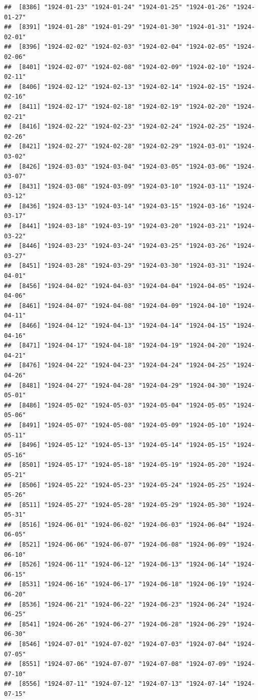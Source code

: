 \documentclass{article}\usepackage[]{graphicx}\usepackage[]{color}
\makeatletter
\newenvironment{kframe}{%
 \def\at@end@of@kframe{}%
 \ifinner\ifhmode%
  \def\at@end@of@kframe{\end{minipage}}%
  \begin{minipage}{\columnwidth}%
 \fi\fi%
 \def\FrameCommand##1{\hskip\@totalleftmargin \hskip-\fboxsep
 \colorbox{shadecolor}{##1}\hskip-\fboxsep
     \hskip-\linewidth \hskip-\@totalleftmargin \hskip\columnwidth}%
 \MakeFramed {\advance\hsize-\width
   \@totalleftmargin\z@ \linewidth\hsize
   \@setminipage}}%
 {\par\unskip\endMakeFramed%
 \at@end@of@kframe}
\newenvironment{knitrout}{}{} %
\makeatother
\begin{document}
\begin{description}
\begin{knitrout}
\begin{kframe}
\begin{verbatim}
##  [8386] "1924-01-23" "1924-01-24" "1924-01-25" "1924-01-26" "1924-01-27"
##  [8391] "1924-01-28" "1924-01-29" "1924-01-30" "1924-01-31" "1924-02-01"
##  [8396] "1924-02-02" "1924-02-03" "1924-02-04" "1924-02-05" "1924-02-06"
##  [8401] "1924-02-07" "1924-02-08" "1924-02-09" "1924-02-10" "1924-02-11"
##  [8406] "1924-02-12" "1924-02-13" "1924-02-14" "1924-02-15" "1924-02-16"
##  [8411] "1924-02-17" "1924-02-18" "1924-02-19" "1924-02-20" "1924-02-21"
##  [8416] "1924-02-22" "1924-02-23" "1924-02-24" "1924-02-25" "1924-02-26"
##  [8421] "1924-02-27" "1924-02-28" "1924-02-29" "1924-03-01" "1924-03-02"
##  [8426] "1924-03-03" "1924-03-04" "1924-03-05" "1924-03-06" "1924-03-07"
##  [8431] "1924-03-08" "1924-03-09" "1924-03-10" "1924-03-11" "1924-03-12"
##  [8436] "1924-03-13" "1924-03-14" "1924-03-15" "1924-03-16" "1924-03-17"
##  [8441] "1924-03-18" "1924-03-19" "1924-03-20" "1924-03-21" "1924-03-22"
##  [8446] "1924-03-23" "1924-03-24" "1924-03-25" "1924-03-26" "1924-03-27"
##  [8451] "1924-03-28" "1924-03-29" "1924-03-30" "1924-03-31" "1924-04-01"
##  [8456] "1924-04-02" "1924-04-03" "1924-04-04" "1924-04-05" "1924-04-06"
##  [8461] "1924-04-07" "1924-04-08" "1924-04-09" "1924-04-10" "1924-04-11"
##  [8466] "1924-04-12" "1924-04-13" "1924-04-14" "1924-04-15" "1924-04-16"
##  [8471] "1924-04-17" "1924-04-18" "1924-04-19" "1924-04-20" "1924-04-21"
##  [8476] "1924-04-22" "1924-04-23" "1924-04-24" "1924-04-25" "1924-04-26"
##  [8481] "1924-04-27" "1924-04-28" "1924-04-29" "1924-04-30" "1924-05-01"
##  [8486] "1924-05-02" "1924-05-03" "1924-05-04" "1924-05-05" "1924-05-06"
##  [8491] "1924-05-07" "1924-05-08" "1924-05-09" "1924-05-10" "1924-05-11"
##  [8496] "1924-05-12" "1924-05-13" "1924-05-14" "1924-05-15" "1924-05-16"
##  [8501] "1924-05-17" "1924-05-18" "1924-05-19" "1924-05-20" "1924-05-21"
##  [8506] "1924-05-22" "1924-05-23" "1924-05-24" "1924-05-25" "1924-05-26"
##  [8511] "1924-05-27" "1924-05-28" "1924-05-29" "1924-05-30" "1924-05-31"
##  [8516] "1924-06-01" "1924-06-02" "1924-06-03" "1924-06-04" "1924-06-05"
##  [8521] "1924-06-06" "1924-06-07" "1924-06-08" "1924-06-09" "1924-06-10"
##  [8526] "1924-06-11" "1924-06-12" "1924-06-13" "1924-06-14" "1924-06-15"
##  [8531] "1924-06-16" "1924-06-17" "1924-06-18" "1924-06-19" "1924-06-20"
##  [8536] "1924-06-21" "1924-06-22" "1924-06-23" "1924-06-24" "1924-06-25"
##  [8541] "1924-06-26" "1924-06-27" "1924-06-28" "1924-06-29" "1924-06-30"
##  [8546] "1924-07-01" "1924-07-02" "1924-07-03" "1924-07-04" "1924-07-05"
##  [8551] "1924-07-06" "1924-07-07" "1924-07-08" "1924-07-09" "1924-07-10"
##  [8556] "1924-07-11" "1924-07-12" "1924-07-13" "1924-07-14" "1924-07-15"

\end{verbatim}
\end{kframe}
\end{knitrout}
\end{description}
\end{document}
